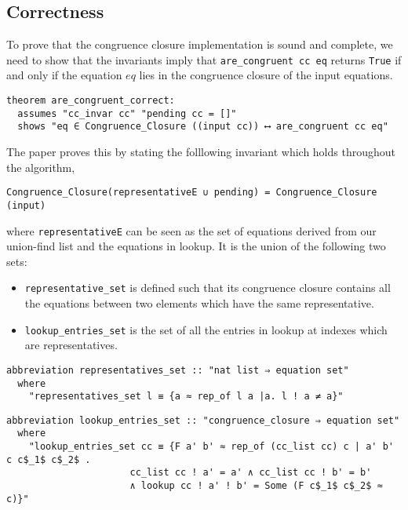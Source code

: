 \subsection{Correctness}
\label{subsection:uf-correctness}

To prove that the congruence closure implementation is sound and complete, we need to show that the invariants imply that \lstinline{are_congruent cc eq} returns \lstinline{True} if and only if the equation $eq$ lies in the congruence closure of the input equations.

\begin{lstlisting}
theorem are_congruent_correct:
  assumes "cc_invar cc" "pending cc = []"
  shows "eq ∈ Congruence_Closure ((input cc)) ⟷ are_congruent cc eq"
\end{lstlisting}

The paper \cite{Nieuwenhuis} proves this by stating the folllowing invariant which holds throughout the algorithm,

\begin{lstlisting}
Congruence_Closure(representativeE ∪ pending) = Congruence_Closure (input)
\end{lstlisting}

where \lstinline{representativeE} can be seen as the set of equations derived from our union-find list and the equations in lookup. It is the union of the following two sets:

\begin{itemize}
    \item\lstinline{representative_set} is defined such that its congruence closure contains all the equations between two elements which have the same representative.
    \item\lstinline{lookup_entries_set} is the set of all the entries in lookup at indexes which are representatives.
\end{itemize}

\begin{lstlisting}
abbreviation representatives_set :: "nat list ⇒ equation set"
  where
    "representatives_set l ≡ {a ≈ rep_of l a |a. l ! a ≠ a}"
\end{lstlisting}

\begin{lstlisting}
abbreviation lookup_entries_set :: "congruence_closure ⇒ equation set"
  where
    "lookup_entries_set cc ≡ {F a' b' ≈ rep_of (cc_list cc) c | a' b' c c$_1$ c$_2$ .
                      cc_list cc ! a' = a' ∧ cc_list cc ! b' = b'
                      ∧ lookup cc ! a' ! b' = Some (F c$_1$ c$_2$ ≈ c)}"
\end{lstlisting}

